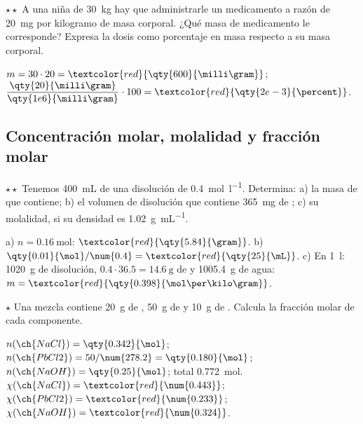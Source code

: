 \begin{exercise}
    \(\star\star\) A una niña de \qty{30}{\kilo\gram} hay que administrarle un medicamento a razón de \qty{20}{\milli\gram} por
    kilogramo de masa corporal. ¿Qué masa de medicamento le corresponde? Expresa la dosis como porcentaje en masa respecto a su
    masa corporal.
    \begin{solu}
        \(m = 30 \cdot 20 = \textcolor{red}{\qty{600}{\milli\gram}}\); \(\dfrac{\qty{20}{\milli\gram}}{\qty{1e6}{\milli\gram}} \cdot 100 =
        \textcolor{red}{\qty{2e-3}{\percent}}\).
    \end{solu}
\end{exercise}

\subsection{Concentración molar, molalidad y fracción molar}

\begin{exercise}
    \(\star\star\) Tenemos \qty{400}{\mL} de una disolución de  \qty{0.4}{\mol\per\litre}. Determina: a) la masa de
     que contiene; b) el volumen de disolución que contiene \qty{365}{\milli\gram} de ; c) su molalidad, si su
    densidad es \qty{1.02}{\gram\per\mL}.
    \begin{solu}
        a) \(n = \qty{0.16}{\mol}\): \(\textcolor{red}{\qty{5.84}{\gram}}\). b) \(\qty{0.01}{\mol}/\num{0.4} = \textcolor{red}{\qty{25}{\mL}}\).
        c) En \qty{1}{\litre}: \qty{1020}{\gram} de disolución, \(\num{0.4} \cdot \num{36.5} = \qty{14.6}{\gram}\) de  y
        \qty{1005.4}{\gram} de agua: \(m = \textcolor{red}{\qty{0.398}{\mol\per\kilo\gram}}\).
    \end{solu}
\end{exercise}

\begin{exercise}
    \(\star\) Una mezcla contiene \qty{20}{\gram} de , \qty{50}{\gram} de  y \qty{10}{\gram} de .
    Calcula la fracción molar de cada componente.
    \begin{solu}
        \(n(\ch{NaCl}) = \qty{0.342}{\mol}\); \(n(\ch{PbCl2}) = 50/\num{278.2} = \qty{0.180}{\mol}\); \(n(\ch{NaOH}) = \qty{0.25}{\mol}\); total \qty{0.772}{\mol}.
        \(\chi(\ch{NaCl}) = \textcolor{red}{\num{0.443}}\); \(\chi(\ch{PbCl2}) = \textcolor{red}{\num{0.233}}\); \(\chi(\ch{NaOH}) = \textcolor{red}{\num{0.324}}\).
    \end{solu}
\end{exercise}

